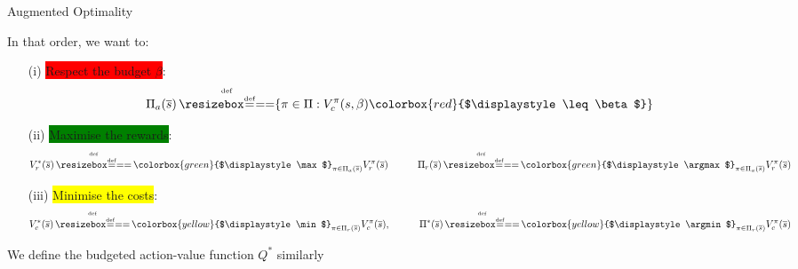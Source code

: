 \documentclass[french,handout]{beamer}
\newcommand{\mathcolorbox}[2]{\colorbox{#1}{$\displaystyle #2$}}
\begin{document}
    \begin{frame}{Augmented Optimality}
        \begin{definition}
            In that order, we want to:
            \begin{enumerate}
                \item[(i)] \pause\colorbox{red}{Respect the budget $\beta$}:
                \begin{equation*}
                    \Pi_a(\os) \eqdef \{\pi\in\Pi: V_c^\pi(s, \beta) \mathcolorbox{red}{\leq \beta}\}
                \end{equation*}
                \item[(ii)] \pause\colorbox{green}{Maximise the rewards}:
                \begin{equation*}
                    V_r^*(\os) \eqdef \mathcolorbox{green}{\max}_{\pi\in\Pi_a(\os)}  V_r^\pi(\os) \qquad\quad \Pi_r(\os) \eqdef \mathcolorbox{green}{\argmax}_{\pi\in\Pi_a(\os)}  V_r^\pi(\os)
                \end{equation*}
                \item[(iii)] \pause\colorbox{yellow}{Minimise the costs}:
                \begin{equation*}
                    V_c^*(\os) \eqdef \mathcolorbox{yellow}{\min}_{\pi\in\Pi_r(\os)}  V_c^\pi(\os), \qquad\quad \Pi^*(\os) \eqdef \mathcolorbox{yellow}{\argmin}_{\pi\in\Pi_r(\os)}  V_c^\pi(\os)
                \end{equation*}
            \end{enumerate}

            \pause We define the budgeted action-value function $Q^*$ similarly
        \end{definition}
    \end{frame}
\end{document}
